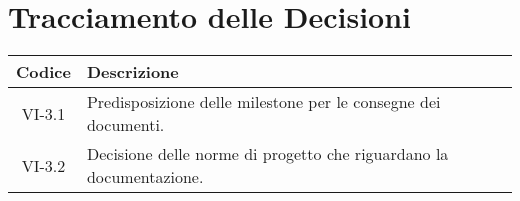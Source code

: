 \section*{Tracciamento delle Decisioni}

\begin{center}
	\begin{longtable}{|c|p{14.5cm}|}
	\hline
	\rowcolor{lighter-grayer}
	\textbf{Codice} & \textbf{Descrizione} \\
	\hline
	\endfirsthead

	\hline
	VI-3.1 & Predisposizione delle milestone per le consegne dei documenti. \\
	VI-3.2 & Decisione delle norme di progetto che riguardano la documentazione. \\
	\hline

	\end{longtable}
\end{center}
